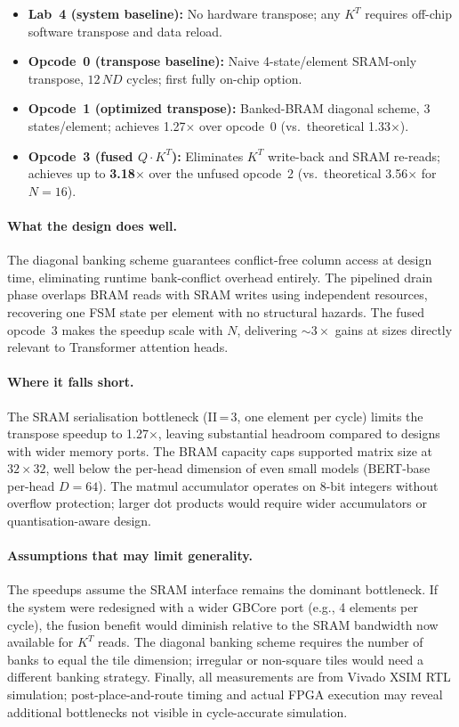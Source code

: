 \documentclass[11pt]{article}
\begin{document}
\begin{itemize}[nosep]
  \item \textbf{Lab~4 (system baseline):} No hardware transpose; any $K^T$
        requires off-chip software transpose and data reload.
  \item \textbf{Opcode~0 (transpose baseline):} Naive 4-state/element
        SRAM-only transpose, $12\,ND$ cycles; first fully on-chip option.
  \item \textbf{Opcode~1 (optimized transpose):} Banked-BRAM diagonal
        scheme, 3 states/element; achieves 1.27$\times$ over opcode~0
        (vs.\ theoretical 1.33$\times$).
  \item \textbf{Opcode~3 (fused $Q\!\cdot\!K^T$):} Eliminates $K^T$
        write-back and SRAM re-reads; achieves up to \textbf{3.18$\times$}
        over the unfused opcode~2 (vs.\ theoretical 3.56$\times$ for
        $N\!=\!16$).
\end{itemize}

\paragraph{What the design does well.}
The diagonal banking scheme guarantees conflict-free column access at
design time, eliminating runtime bank-conflict overhead entirely. The
pipelined drain phase overlaps BRAM reads with SRAM writes using independent
resources, recovering one FSM state per element with no structural hazards.
The fused opcode~3 makes the speedup scale with $N$, delivering
${\sim}3\times$ gains at sizes directly relevant to Transformer attention heads.

\paragraph{Where it falls short.}
The SRAM serialisation bottleneck (II\,=\,3, one element per cycle) limits the
transpose speedup to 1.27$\times$, leaving substantial headroom compared to
designs with wider memory ports. The BRAM capacity caps supported matrix size
at $32\!\times\!32$, well below the per-head dimension of even small models
(BERT-base per-head $D = 64$). The matmul accumulator operates on 8-bit
integers without overflow protection; larger dot products would require wider
accumulators or quantisation-aware design.

\paragraph{Assumptions that may limit generality.}
The speedups assume the SRAM interface remains the dominant bottleneck. If the
system were redesigned with a wider GBCore port (e.g., 4 elements per cycle),
the fusion benefit would diminish relative to the SRAM bandwidth now available
for $K^T$ reads. The diagonal banking scheme requires the number of banks to
equal the tile dimension; irregular or non-square tiles would need a different
banking strategy. Finally, all measurements are from Vivado XSIM RTL
simulation; post-place-and-route timing and actual FPGA execution may reveal
additional bottlenecks not visible in cycle-accurate simulation.
\end{document}
